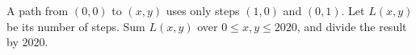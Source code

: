 A path from $(0,0)$ to $(x,y)$ uses only steps $(1,0)$ and $(0,1)$. Let $L(x,y)$ be its number of steps. Sum $L(x,y)$ over $0\le x,y\le2020$, and divide the result by $2020$.
